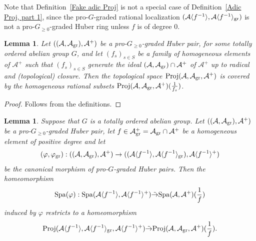 \documentclass[12pt,twoside,a4paper]{article}
\newtheorem{lemma}[thm]{Lemma}
\theoremstyle{definition}
\theoremstyle{remark}
\newcommand\gr{{\rm gr}}
\newcommand\Proj{{\rm Proj}}
\newcommand\Spa{{\rm Spa}}
\begin{document}
Note that Definition~\ref{Fake adic Proj} is not a special case of Definition~\ref{Adic Proj, part 1}, since the pro-$G$-graded rational localization $(\mathcal{A}\langle f^{-1}\rangle, \mathcal{A}\langle f^{-1}\rangle_{\gr})$ is not a pro-$G_{\geq0}$-graded Huber ring unless $f$ is of degree $0$.  
\begin{lemma}\label{Topological space}Let $((\mathcal{A}, \mathcal{A}_{\gr}), \mathcal{A}^{+})$ be a pro-$G_{\geq0}$-graded Huber pair, for some totally ordered abelian group $G$, and let $(f_{s})_{s\in S}$ be a family of homogeneous elements of $\mathcal{A}^{+}$ such that $(f_{s})_{s\in S}$ generate the ideal $(\mathcal{A}, \mathcal{A}_{\gr})\cap \mathcal{A}^{+}$ of $\mathcal{A}^{+}$ up to radical and (topological) closure. Then the topological space $\Proj(\mathcal{A}, \mathcal{A}_{\gr}, \mathcal{A}^{+})$ is covered by the homogeneous rational subsets $\Proj(\mathcal{A}, \mathcal{A}_{\gr}, \mathcal{A}^{+})(\frac{1}{f_{s}})$. \end{lemma}
\begin{proof}Follows from the definitions.\end{proof}
\begin{lemma}\label{Gluing -1}Suppose that $G$ is a totally ordered abelian group. Let $((\mathcal{A}, \mathcal{A}_{\gr}), \mathcal{A}^{+})$ be a pro-$G_{\geq0}$-graded Huber pair, let $f\in \mathcal{A}_{\gr}^{+}=\mathcal{A}_{\gr}\cap \mathcal{A}^{+}$ be a homogeneous element of positive degree and let \begin{equation*}(\varphi, \varphi_{\gr}): ((\mathcal{A}, \mathcal{A}_{\gr}), \mathcal{A}^{+})\to ((\mathcal{A}\langle f^{-1}\rangle, \mathcal{A}\langle f^{-1}\rangle_{\gr}), \mathcal{A}\langle f^{-1}\rangle^{+})\end{equation*}be the canonical morphism of pro-$G$-graded Huber pairs. Then the homeomorphism \begin{equation*}\Spa(\varphi): \Spa(\mathcal{A}\langle f^{-1}\rangle, \mathcal{A}\langle f^{-1}\rangle^{+})\tilde{\to} \Spa(\mathcal{A}, \mathcal{A}^{+})(\frac{1}{f})\end{equation*}induced by $\varphi$ restricts to a homeomorphism \begin{equation*}\Proj(\mathcal{A}\langle f^{-1}\rangle, \mathcal{A}\langle f^{-1}\rangle_{\gr}, \mathcal{A}\langle f^{-1}\rangle^{+})\tilde{\to}\Proj(\mathcal{A}, \mathcal{A}_{\gr}, \mathcal{A}^{+})(\frac{1}{f}).\end{equation*}\end{lemma}
\end{document}
